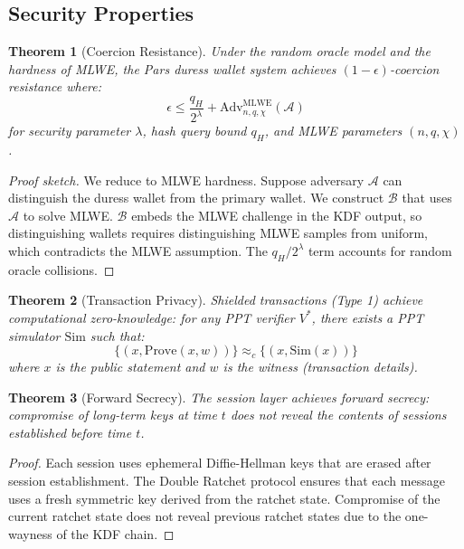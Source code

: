 \documentclass[11pt,a4paper,twocolumn]{article}
\newtheorem{theorem}{Theorem}[section]
\begin{document}
\subsection{Security Properties}

\begin{theorem}[Coercion Resistance]
\label{thm:coercion}
Under the random oracle model and the hardness of MLWE, the Pars duress wallet system achieves $(1-\epsilon)$-coercion resistance where:
$$\epsilon \leq \frac{q_H}{2^{\lambda}} + \text{Adv}^{\text{MLWE}}_{n,q,\chi}(\mathcal{A})$$
for security parameter $\lambda$, hash query bound $q_H$, and MLWE parameters $(n,q,\chi)$.
\end{theorem}

\begin{proof}[Proof sketch]
We reduce to MLWE hardness. Suppose adversary $\mathcal{A}$ can distinguish the duress wallet from the primary wallet. We construct $\mathcal{B}$ that uses $\mathcal{A}$ to solve MLWE. $\mathcal{B}$ embeds the MLWE challenge in the KDF output, so distinguishing wallets requires distinguishing MLWE samples from uniform, which contradicts the MLWE assumption. The $q_H/2^{\lambda}$ term accounts for random oracle collisions.
\end{proof}

\begin{theorem}[Transaction Privacy]
Shielded transactions (Type 1) achieve computational zero-knowledge: for any PPT verifier $V^*$, there exists a PPT simulator $\text{Sim}$ such that:
$$\{(x, \text{Prove}(x, w))\} \approx_c \{(x, \text{Sim}(x))\}$$
where $x$ is the public statement and $w$ is the witness (transaction details).
\end{theorem}

\begin{theorem}[Forward Secrecy]
The session layer achieves forward secrecy: compromise of long-term keys at time $t$ does not reveal the contents of sessions established before time $t$.
\end{theorem}

\begin{proof}
Each session uses ephemeral Diffie-Hellman keys that are erased after session establishment. The Double Ratchet protocol ensures that each message uses a fresh symmetric key derived from the ratchet state. Compromise of the current ratchet state does not reveal previous ratchet states due to the one-wayness of the KDF chain.
\end{proof}
\end{document}
